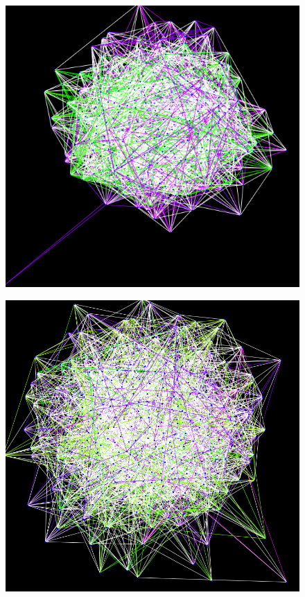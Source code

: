 \begin{figure}
\centering \includegraphics[scale=0.5]{uuf250-090.png}
\caption{}\label{}
\end{figure}
\begin{figure}
\centering \includegraphics[scale=0.5]{uuf070.png}
\caption{}\label{}
\end{figure}
